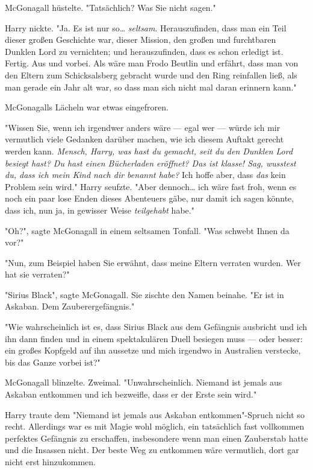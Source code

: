 {McGonagall hüstelte. "Tatsächlich? Was Sie nicht sagen."

Harry nickte. "Ja. Es ist nur so… \emph{seltsam}. Herauszufinden, dass man ein Teil dieser großen Geschichte war, dieser Mission, den großen und furchtbaren Dunklen Lord zu vernichten; und herauszufinden, dass es schon erledigt ist. Fertig. Aus und vorbei. Als wäre man Frodo Beutlin und erfährt, dass man von den Eltern zum Schicksalsberg gebracht wurde und den Ring reinfallen ließ, als man gerade ein Jahr alt war, so dass man sich nicht mal daran erinnern kann."

McGonagalls Lächeln war etwas eingefroren.

"Wissen Sie, wenn ich irgendwer anders wäre --- egal wer --- würde ich mir vermutlich viele Gedanken darüber machen, wie ich diesem Auftakt gerecht werden kann. \emph{Mensch, Harry, was hast du gemacht, seit du den Dunklen Lord besiegt hast? Du hast einen Bücherladen eröffnet? Das ist klasse! Sag, wusstest du, dass ich mein Kind nach dir benannt habe?} Ich hoffe aber, dass \emph{das} kein Problem sein wird." Harry seufzte. "Aber dennoch… ich wäre fast froh, wenn es noch ein paar lose Enden dieses Abenteuers gäbe, nur damit ich sagen könnte, dass ich, nun ja, in gewisser Weise \emph{teilgehabt} habe."

"Oh?", sagte McGonagall in einem seltsamen Tonfall. "Was schwebt Ihnen da vor?"

"Nun, zum Beispiel haben Sie erwähnt, dass meine Eltern verraten wurden. Wer hat sie verraten?"

"Sirius Black", sagte McGonagall. Sie zischte den Namen beinahe. "Er ist in Askaban. Dem Zauberergefängnis."

"Wie wahrscheinlich ist es, dass Sirius Black aus dem Gefängnis ausbricht und ich ihn dann finden und in einem spektakulären Duell besiegen muss --- oder besser: ein großes Kopfgeld auf ihn aussetze und mich irgendwo in Australien verstecke, bis das Ganze vorbei ist?"

McGonagall blinzelte. Zweimal. "Unwahrscheinlich. Niemand ist jemals aus Askaban entkommen und ich bezweifle, dass er der Erste sein wird."

Harry traute dem "Niemand ist jemals aus Askaban entkommen"-Spruch nicht so recht. Allerdings war es mit Magie wohl möglich, ein tatsächlich fast vollkommen perfektes Gefängnis zu erschaffen, insbesondere wenn man einen Zauberstab hatte und die Insassen nicht. Der beste Weg zu entkommen wäre vermutlich, dort gar nicht erst hinzukommen.

}
